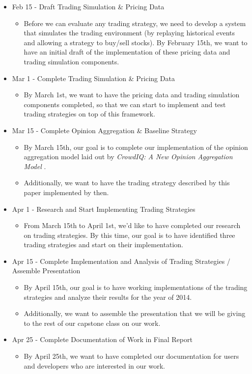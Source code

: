 \begin{itemize}
\item Feb 15 - Draft Trading Simulation \& Pricing Data
  \begin{itemize}
    \item Before we can evaluate any trading strategy, we need to develop a system that simulates the trading environment (by replaying historical events and allowing a strategy to buy/sell stocks). By February 15th, we want to have an initial draft of the implementation of these pricing data and trading simulation components.
  \end{itemize}
\item Mar 1 - Complete Trading Simulation \& Pricing Data
  \begin{itemize}
  \item By March 1st, we want to have the pricing data and trading simulation components completed, so that we can start to implement and test trading strategies on top of this framework.
  \end{itemize}
\item Mar 15 - Complete Opinion Aggregation \& Baseline Strategy
  \begin{itemize}
  \item By March 15th, our goal is to complete our implementation of the opinion aggregation model laid out by \textit{CrowdIQ: A New Opinion Aggregation Model} \cite{crowdiq}.
  \item Additionally, we want to have the trading strategy described by this paper implemented by then.
  \end{itemize}
\item Apr 1 - Research and Start Implementing Trading Strategies
  \begin{itemize}
  \item From March 15th to April 1st, we'd like to have completed our research on trading strategies. By this time, our goal is to have identified three trading strategies and start on their implementation.
  \end{itemize}
\item Apr 15 - Complete Implementation and Analysis of Trading Strategies / Assemble Presentation
  \begin{itemize}
  \item By April 15th, our goal is to have working implementations of the trading strategies and analyze their results for the year of 2014.
  \item Additionally, we want to assemble the presentation that we will be giving to the rest of our capstone class on our work.
  \end{itemize}
\item Apr 25 - Complete Documentation of Work in Final Report
  \begin{itemize}
  \item By April 25th, we want to have completed our documentation for users and developers who are interested in our work.
  \end{itemize}
\end{itemize}


